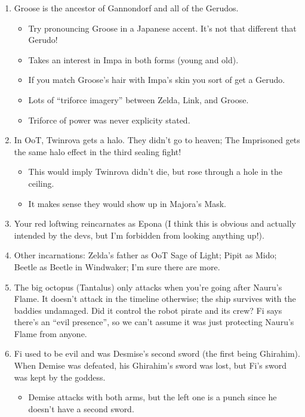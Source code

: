 \newpage
{}

\begin{enumerate}
	\item{Groose is the ancestor of Gannondorf and all of the Gerudos.
		\begin{itemize}
			\item{Try pronouncing Groose in a Japanese accent. It's not that different that Gerudo!}
			\item{Takes an interest in Impa in both forms (young and old).}
			\item{If you match Groose's hair with Impa's skin you sort of get a Gerudo.}
			\item{Lots of ``triforce imagery'' between Zelda, Link, and Groose.} 
			\item{Triforce of power was never explicity stated.}
		\end{itemize}
	}
	\item{In OoT, Twinrova gets a halo. They didn't go to heaven; The Imprisoned gets the same halo effect in the third sealing fight!
		\begin{itemize}
			\item{This would imply Twinrova didn't die, but rose through a hole in the ceiling.}
			\item{It makes sense they would show up in Majora's Mask.}
		\end{itemize}
	}
	\item{Your red loftwing reincarnates as Epona (I think this is obvious and actually intended by the devs, but I'm forbidden from looking anything up!).}
	\item{Other incarnations: Zelda's father as OoT Sage of Light; Pipit as Mido; Beetle as Beetle in Windwaker; I'm sure there are more.}
	\item{The big octopus (Tantalus) only attacks when you're going after Nauru's Flame. It doesn't attack in the timeline otherwise; the ship survives with the baddies undamaged. Did it control the robot pirate and its crew? Fi says there's an ``evil presence'', so we can't assume it was just protecting Nauru's Flame from anyone.}
	\item{Fi used to be evil and was Desmise's second sword (the first being Ghirahim). When Demise was defeated, his Ghirahim's sword was lost, but Fi's sword was kept by the goddess.
		\begin{itemize}
			\item{Demise attacks with both arms, but the left one is a punch since he doesn't have a second sword.}

\end{itemize}}
\end{enumerate}

